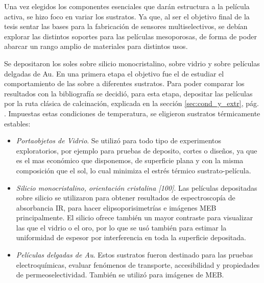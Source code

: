 	Una vez elegidos los componentes esenciales que darán estructura a la película activa, se hizo foco en variar los sustratos. Ya que, al ser el objetivo final de la tesis sentar las bases para la fabricación de sensores multiselectivos, se debían explorar las distintos soportes para las películas mesoporosas, de forma de poder abarcar un rango amplio de materiales para distintos usos.

	Se depositaron los soles sobre silicio monocristalino, sobre vidrio y sobre películas delgadas de Au. En una primera etapa el objetivo fue el de estudiar el comportamiento de las \pdm\space sobre a diferentes sustratos. Para poder comparar los resultados con la bibliografía\cite{Soler-Illia2006,Brinker1990} se decidió, para esta etapa, depositar las películas por la ruta clásica de calcinación, explicada en la sección \ref{sec:cond_y_extr}, pág. \pageref{sec:cond_y_extr}. Impuestas estas condiciones de temperatura, se eligieron sustratos térmicamente estables:

		\begin{itemize}

			\item \textit{Portaobjetos de Vidrio}. Se utilizó para todo tipo de experimentos exploratorios, por ejemplo para pruebas de deposito, cortes o diseños, ya que es el mas económico que disponemos, de superficie plana y con la misma composición que el sol, lo cual minimiza el estrés térmico sustrato-película.

			\item \textit{Silicio monocristalino, orientación cristalina [100]}. Las películas depositadas sobre silicio se utilizaron para obtener resultados de espectroscopía de absorbancia IR, para hacer elipsoporisimetrías e imágenes MEB principalmente. El silicio ofrece también un mayor contraste para visualizar las \pdm\space que el vidrio o el oro, por lo que se usó también para estimar la uniformidad de espesor por interferencia en toda la superficie depositada.
		
			\item \textit{Películas delgadas de Au}. Estos sustratos fueron destinado para las pruebas electroquímicas, evaluar fenómenos de transporte, accesibilidad y propiedades de permeoselectividad. También se utilizó para imágenes de MEB.

			\end{itemize}
	
